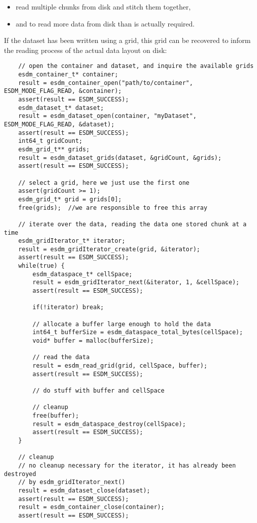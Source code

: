 \begin{itemize}
  \item read multiple chunks from disk and stitch them together,
  \item and to read more data from disk than is actually required.
\end{itemize}

If the dataset has been written using a grid, this grid can be recovered
to inform the reading process of the actual data layout on disk:

\begin{lstlisting}
    // open the container and dataset, and inquire the available grids
    esdm_container_t* container;
    result = esdm_container_open("path/to/container", ESDM_MODE_FLAG_READ, &container);
    assert(result == ESDM_SUCCESS);
    esdm_dataset_t* dataset;
    result = esdm_dataset_open(container, "myDataset", ESDM_MODE_FLAG_READ, &dataset);
    assert(result == ESDM_SUCCESS);
    int64_t gridCount;
    esdm_grid_t** grids;
    result = esdm_dataset_grids(dataset, &gridCount, &grids);
    assert(result == ESDM_SUCCESS);

    // select a grid, here we just use the first one
    assert(gridCount >= 1);
    esdm_grid_t* grid = grids[0];
    free(grids);  //we are responsible to free this array

    // iterate over the data, reading the data one stored chunk at a time
    esdm_gridIterator_t* iterator;
    result = esdm_gridIterator_create(grid, &iterator);
    assert(result == ESDM_SUCCESS);
    while(true) {
        esdm_dataspace_t* cellSpace;
        result = esdm_gridIterator_next(&iterator, 1, &cellSpace);
        assert(result == ESDM_SUCCESS);

        if(!iterator) break;

        // allocate a buffer large enough to hold the data
        int64_t bufferSize = esdm_dataspace_total_bytes(cellSpace);
        void* buffer = malloc(bufferSize);

        // read the data
        result = esdm_read_grid(grid, cellSpace, buffer);
        assert(result == ESDM_SUCCESS);

        // do stuff with buffer and cellSpace

        // cleanup
        free(buffer);
        result = esdm_dataspace_destroy(cellSpace);
        assert(result == ESDM_SUCCESS);
    }

    // cleanup
    // no cleanup necessary for the iterator, it has already been destroyed 
    // by esdm_gridIterator_next()
    result = esdm_dataset_close(dataset);
    assert(result == ESDM_SUCCESS);
    result = esdm_container_close(container);
    assert(result == ESDM_SUCCESS);
\end{lstlisting}

